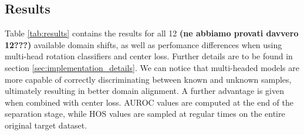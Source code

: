 \documentclass[10pt,twocolumn,letterpaper]{article}
\begin{document}
\subsection{Results}
\label{sec:results}
Table \ref{tab:results} contains the results for all 12 {\bf (ne abbiamo provati davvero 12???)} available domain shifts,
as well as perfomance differences when using multi-head rotation classifiers and center loss.
Further details are to be found in section \ref{sec:implementation_details}.
We can notice that multi-headed models are more capable of correctly discriminating between known and unknown samples,
ultimately resulting in better domain alignment.
A further advantage is given when combined with center loss.
AUROC values are computed at the end of the separation stage, 
while HOS values are sampled at regular times on the entire original target dataset.
\end{document}
